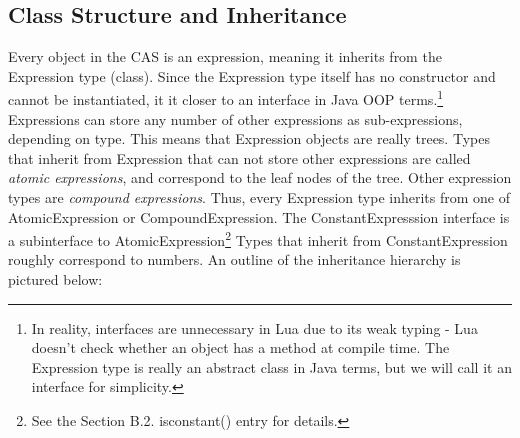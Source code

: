 \documentclass{article}
\begin{document}
 \subsection{Class Structure and Inheritance}
 
Every object in the CAS is an expression, meaning it inherits from the {\ttfamily Expression} type (class). Since the {\ttfamily Expression} type itself has no constructor and cannot be instantiated, it it closer to an interface in Java OOP terms.\footnote{In reality, interfaces are unnecessary in Lua due to its weak typing - Lua doesn't check whether an object has a method at compile time. The {\ttfamily Expression} type is really an abstract class in Java terms, but we will call it an interface for simplicity.} {\ttfamily Expression}s can store any number of other expressions as sub-expressions, depending on type. This means that {\ttfamily Expression} objects are really trees. Types that inherit from {\ttfamily Expression} that can not store other expressions are called \emph{atomic expressions}, and correspond to the leaf nodes of the tree. Other expression types are \emph{compound expressions}. Thus, every {\ttfamily Expression} type inherits from one of {\ttfamily AtomicExpression} or {\ttfamily CompoundExpression}. The {\ttfamily ConstantExpresssion} interface is a subinterface to {\ttfamily AtomicExpression}\footnote{See the Section B.2. {\ttfamily isconstant()} entry for details.} Types that inherit from {\ttfamily ConstantExpression} roughly correspond to numbers. An outline of the inheritance hierarchy is pictured below:
\end{document}
